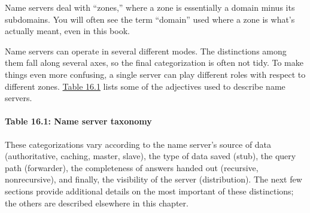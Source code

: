 Name servers deal with ``zones,'' where a zone is essentially a domain
minus its subdomains. You will often see the term ``domain'' used where
a zone is what's actually meant, even in this book.

Name servers can operate in several different modes. The distinctions
among them fall along several axes, so the final categorization is often
not tidy. To make things even more confusing, a single server can play
different roles with respect to different zones.
\protect\hyperlink{part0024_split_011.htmlux5cux23_idTextAnchor855}{Table
16.1} lists some of the adjectives used to describe name servers.

\paragraph[{Table 16.1: }Name server taxonomy]{\texorpdfstring{{Table
16.1:
}\protect\hypertarget{part0024_split_011.htmlux5cux23_idIndexMarker2013}{}{}\protect\hypertarget{part0024_split_011.htmlux5cux23_idTextAnchor855}{}{}Name
server
taxonomy\protect\hypertarget{part0024_split_011.htmlux5cux23_idIndexMarker2014}{}{}\protect\hypertarget{part0024_split_011.htmlux5cux23_idIndexMarker2015}{}{}\protect\hypertarget{part0024_split_011.htmlux5cux23_idIndexMarker2016}{}{}\protect\hypertarget{part0024_split_011.htmlux5cux23_idIndexMarker2017}{}{}\protect\hypertarget{part0024_split_011.htmlux5cux23_idIndexMarker2018}{}{}\protect\hypertarget{part0024_split_011.htmlux5cux23_idIndexMarker2019}{}{}\protect\hypertarget{part0024_split_011.htmlux5cux23_idIndexMarker2020}{}{}\protect\hypertarget{part0024_split_011.htmlux5cux23_idIndexMarker2021}{}{}\protect\hypertarget{part0024_split_011.htmlux5cux23_idIndexMarker2022}{}{}\protect\hypertarget{part0024_split_011.htmlux5cux23_idIndexMarker2023}{}{}\protect\hypertarget{part0024_split_011.htmlux5cux23_idIndexMarker2024}{}{}\protect\hypertarget{part0024_split_011.htmlux5cux23_idIndexMarker2025}{}{}}{Table 16.1: Name server taxonomy}}


These categorizations vary according to the name server's source of data
(authoritative, caching, master, slave), the type of data saved (stub),
the query path (forwarder), the completeness of answers handed out
(recursive, nonrecursive), and finally, the visibility of the server
(distribution). The next few sections provide additional details on the
most important of these distinctions; the others are described elsewhere
in this chapter.

